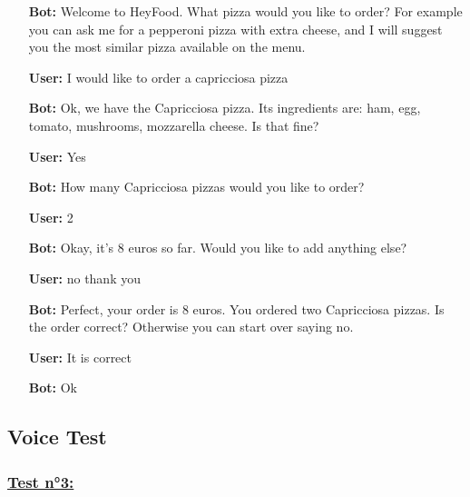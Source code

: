\begin{itemize}

\item[\textbf{Bot:}] Welcome to HeyFood.
What pizza would you like to order? For example you can ask me for a pepperoni pizza with extra cheese, and I will suggest you the most similar pizza available on the menu.


\item[\textbf{User:}] I would like to order a capricciosa pizza

\item[\textbf{Bot:}] Ok, we have the Capricciosa pizza. Its ingredients are: ham, egg, tomato, mushrooms, mozzarella cheese. Is that fine?

\item[\textbf{User:}] Yes

\item[\textbf{Bot:}]How many Capricciosa pizzas would you like to order?

\item[\textbf{User:}] 2

\item[\textbf{Bot:}] Okay, it’s 8 euros so far. Would you like to add anything else?

\item[\textbf{User:}]no thank you

\item[\textbf{Bot:}] Perfect, your order is 8 euros. You ordered  two Capricciosa pizzas. Is the order correct? Otherwise you can start over saying no.


\item[\textbf{User:}] It is correct

\item[\textbf{Bot:}] Ok

\end{itemize}


\newpage

\subsection{Voice Test}

\subsubsection*{\underline{Test n°3:} }

